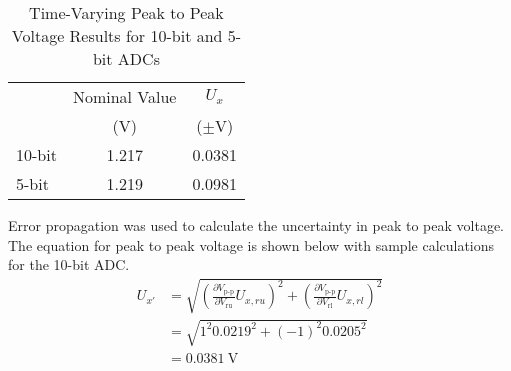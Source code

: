 \begin{table}[h]
   \centering
   \caption{Time-Varying Peak to Peak Voltage Results for 10-bit and 5-bit ADCs}
   \label{tab:time-varying-peak-to-peak-voltage-results}
   \begin{tabular}{lcc}
   \toprule
   & Nominal Value & $U_x$ \\
   & (V)           & ($\pm$V)   \\
   \midrule
   10-bit & 1.217 & 0.0381  \\
   5-bit  & 1.219 & 0.0981   \\
   \bottomrule
   \end{tabular}
\end{table}
\FloatBarrier
\noindent Error propagation was used to calculate the uncertainty in peak to peak voltage. The equation for peak to peak voltage is shown below with 
sample calculations for the 10-bit ADC.
\[
\begin{aligned}
   U_{x'} &= \sqrt{\left(\frac{\partial V_{\text{p-p}}}{\partial V_{\text{ru}}} U_{x, ru}\right)^2 + \left(\frac{\partial V_{\text{p-p}}}{\partial V_{\text{rl}}} U_{x, rl}\right)^2} \\
          &= \sqrt{1^2 0.0219^2 + (-1)^2 0.0205^2} \\
            &= \boxed{\qty{0.0381}{\volt}}
\end{aligned}
\]





